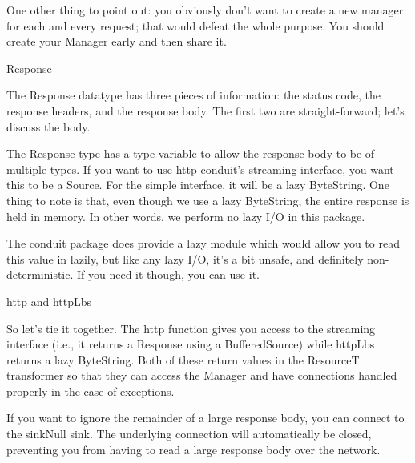 One other thing to point out: you obviously don't want to create a new
manager for each and every request; that would defeat the whole
purpose. You should create your Manager early and then share it.

Response

The Response datatype has three pieces of information: the status
code, the response headers, and the response body. The first two are
straight-forward; let's discuss the body.

The Response type has a type variable to allow the response body to be
of multiple types. If you want to use http-conduit's streaming
interface, you want this to be a Source. For the simple interface, it
will be a lazy ByteString. One thing to note is that, even though we
use a lazy ByteString, the entire response is held in memory. In other
words, we perform no lazy I/O in this package.

The conduit package does provide a lazy module which would allow you
to read this value in lazily, but like any lazy I/O, it's a bit
unsafe, and definitely non-deterministic. If you need it though, you
can use it.

http and httpLbs

So let's tie it together. The http function gives you access to the
streaming interface (i.e., it returns a Response using a
BufferedSource) while httpLbs returns a lazy ByteString. Both of these
return values in the ResourceT transformer so that they can access the
Manager and have connections handled properly in the case of
exceptions.

If you want to ignore the remainder of a large response body, you can
connect to the sinkNull sink. The underlying connection will
automatically be closed, preventing you from having to read a large
response body over the network.
